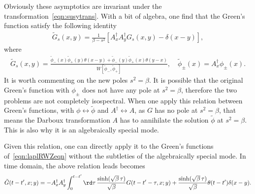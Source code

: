 Obviously these asymptotics are invariant under the transformation~\eqref{eqn:susytrans}. With a bit of algebra, one find that the Green's function satisfy the following identity
\begin{align}
    \tilde{G}_s(x,y) = \frac{1}{\beta-s^2}[A^\dagger_x A^\dagger_y G_s(x,y)-\delta(x-y)],
\end{align}
where
\begin{align}
    \tilde{G}_s(x,y) = \frac{\tilde{\phi}_-(x)\tilde{\phi}_+(y)\theta(x-y)+\tilde{\phi}_-(y)\tilde{\phi}_+(x)\theta(y-x)}{W[\tilde{\phi}_-,\tilde{\phi}_+]}, \quad 
    \tilde{\phi}_{\pm}(x) = A^{\dagger}_x\phi_{\pm}(x) . 
\end{align}
It is worth commenting on the new poles $s^2 =\beta$. It is possible that the original Green's function with $\phi_{\pm}$ does not have any pole at  $s^2 =\beta$, therefore the two problems are not completely isospectral. When one apply this relation between Green's functions, with $\phi \leftrightarrow \tilde{\phi}$  and $A^\dagger \leftrightarrow A$, as $G$ has no pole at $s^2 =\beta$, that means the Darboux transformation $A$ has to annihilate the solution $\tilde{\phi}$ at  $s^2 =\beta$. This is also why it is an algebraically special mode.
 
Given this relation, one can directly apply it to the Green's functions of~\eqref{eqn:laplRWZeqn} without the subtleties of the algebraically special mode. In time domain, the above relation leads becomes
\begin{align}
    \tilde{G}(t-t',x;y) = -A^\dagger_x  A^\dagger_y \int_0^{t-t'}\rd \tau \,\frac{\sinh(\sqrt{\beta} \,\tau )}{\sqrt{\beta}}G(t-t'-\tau,x;y) + \frac{\sinh(\sqrt{\beta} \,\tau )}{\sqrt{\beta}}\theta(t-t')\delta(x-y) .
\end{align}








